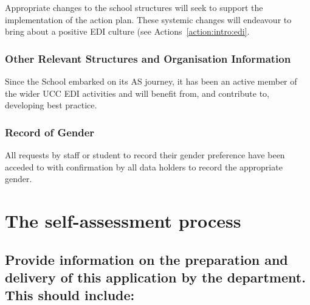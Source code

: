 Appropriate changes to the school structures will seek to support the implementation of the action plan. These systemic changes will endeavour to bring about a positive EDI culture (see Actions~\ref{action:intro:edi}. %


\subsubsection{Other Relevant Structures and Organisation Information}
Since the School embarked on its AS journey, it has been an active member of the wider UCC EDI activities and will benefit from, and contribute to, developing best practice.


\subsubsection{Record of Gender}
All requests by staff or student to record their gender preference have been acceded to with confirmation by all data holders to record the appropriate gender.  






\section{The self-assessment process}


\subsection{Provide information on the preparation and delivery of this application by the department. This should include:}


